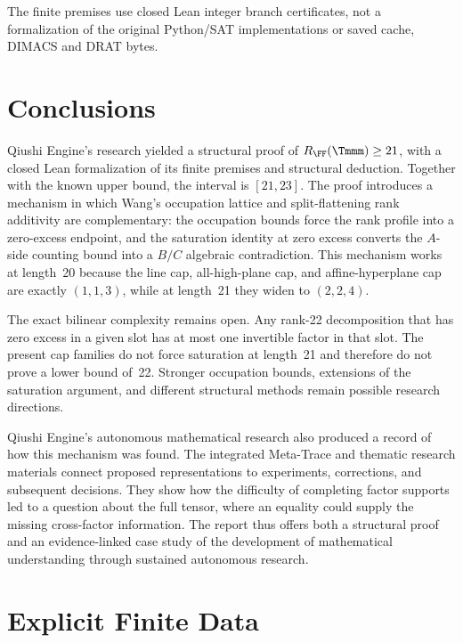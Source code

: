 \documentclass[11pt,a4paper]{article}
\begin{document}
The finite premises use closed Lean integer branch certificates, not a
formalization of the original Python/SAT implementations or saved cache,
DIMACS and DRAT bytes.


\section{Conclusions}

Qiushi Engine's research yielded a structural proof of
$R_{\FF}(\Tmmm)\ge21$, with a closed Lean formalization of its finite
premises and structural deduction.
Together with the known upper bound, the interval is $[21,23]$.  The proof introduces a mechanism in which Wang's occupation lattice and split-flattening rank additivity are complementary: the occupation bounds force the rank profile into a zero-excess endpoint, and the saturation identity at zero excess converts the $A$-side counting bound into a $B/C$ algebraic contradiction.  This mechanism works at length~20 because the line cap, all-high-plane cap, and affine-hyperplane cap are exactly $(1,1,3)$, while at length~21 they widen to $(2,2,4)$.

The exact bilinear complexity remains open. Any rank-22 decomposition that has zero excess in a given slot has at most one invertible factor in that slot. The present cap families do not force saturation at length~21 and therefore do not prove a lower bound of~22. Stronger occupation bounds, extensions of the saturation argument, and different structural methods remain possible research directions.

Qiushi Engine's autonomous mathematical research also produced a record of how
this mechanism was found. The integrated Meta-Trace and thematic research
materials connect proposed representations to experiments, corrections,
and subsequent decisions. They show how the difficulty of completing
factor supports led to a question about the full tensor, where an equality
could supply the missing cross-factor information. The report thus offers
both a structural proof and an evidence-linked case study of the
development of mathematical understanding through sustained autonomous
research.

\bigskip
\appendix
\section{Explicit Finite Data}\label{app:data}
\end{document}
